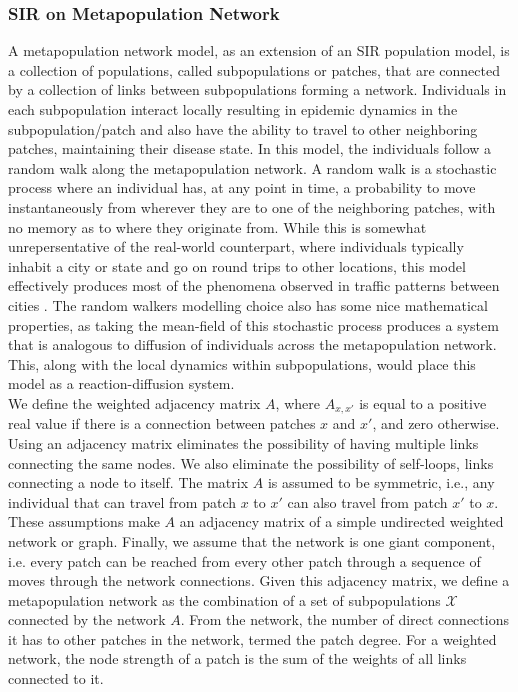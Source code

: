 \subsubsection{SIR on Metapopulation Network}
A metapopulation network model, as an extension of an SIR population model, is a collection of populations, called subpopulations or patches, that are connected by a collection of links between subpopulations forming a network. Individuals in each subpopulation interact locally resulting in epidemic dynamics in the subpopulation/patch and also have the ability to travel to other neighboring patches, maintaining their disease state. In this model, the individuals follow a random walk along the metapopulation network. A random walk is a stochastic process where an individual has, at any point in time, a probability to move instantaneously from wherever they are to one of the neighboring patches, with no memory as to where they originate from.
While this is somewhat unrepersentative of the real-world counterpart, where individuals typically inhabit a city or state and go on round trips to other locations, this model effectively produces most of the phenomena observed in traffic patterns between cities \cite{shao2022epidemic}.
The random walkers modelling choice also has some nice mathematical properties, as taking the mean-field of this stochastic process produces a system that is analogous to diffusion of individuals across the metapopulation network\cite{masuda2017random}.
This, along with the local dynamics within subpopulations, would place this model as a reaction-diffusion system\cite{colizza2007reaction}.\\



We define the weighted adjacency matrix $A$, where $A_{x,x'}$ is equal to a positive real value if there is a connection between patches $x$ and $x'$, and zero otherwise. Using an adjacency matrix eliminates the possibility of having multiple links connecting the same nodes. We also eliminate the possibility of self-loops, links connecting a node to itself. The matrix $A$ is assumed to be symmetric, i.e., any individual that can travel from patch $x$ to $x'$ can also travel from patch $x'$ to $x$. These assumptions make $A$ an adjacency matrix of a simple undirected weighted network or graph. Finally, we assume that the network is one giant component, i.e. every patch can be reached from every other patch through a sequence of moves through the network connections. Given this adjacency matrix, we define a metapopulation network as the combination of a set of subpopulations $\mathcal{X}$ connected by the network $A$. From the network, the number of direct connections it has to other patches in the network, termed the patch degree. For a weighted network, the node strength of a patch is the sum of the weights of all links connected to it. 
\\

